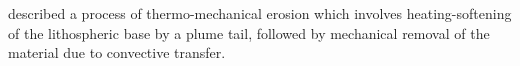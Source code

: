 \documentclass[12pt]{article}
\begin{document}
	\cite{davies1994thermomechanical} described a process of thermo-mechanical erosion which involves heating-softening of the lithospheric base by a plume tail, followed by mechanical removal of the material due to convective transfer. \citep{rondenay2000lithospheric}

\end{document}
